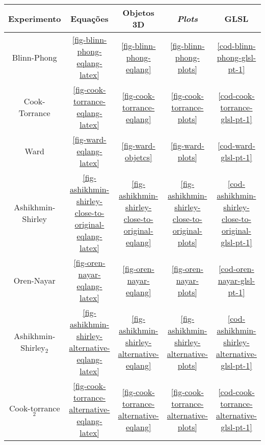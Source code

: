 \begin{table}[H]
\centering
\begin{tabular}{|c|c|c|c|c|}
\hline
    \textbf{Experimento} & \textbf{Equações}                                                & \textbf{Objetos 3D}                                       & \textbf{\textit{Plots}}                                  & \textbf{GLSL}  \\ \hline
    Blinn-Phong          & \autoref{fig-blinn-phong-eqlang-latex}                           & \autoref{fig-blinn-phong-eqlang}                          & \autoref{fig-blinn-phong-plots}                          &                  \autoref{cod-blinn-phong-glsl-pt-1}              \\ \hline
    Cook-Torrance        & \autoref{fig-cook-torrance-eqlang-latex}                         & \autoref{fig-cook-torrance-eqlang}                        & \autoref{fig-cook-torrance-plots}                        &             \autoref{cod-cook-torrance-glsl-pt-1}              \\ \hline
    Ward                 & \autoref{fig-ward-eqlang-latex}                                  & \autoref{fig-ward-objetcs}                                & \autoref{fig-ward-plots}                                 &                     \autoref{cod-ward-glsl-pt-1}               \\ \hline
    Ashikhmin-Shirley    & \autoref{fig-ashikhmin-shirley-close-to-original-eqlang-latex}   & \autoref{fig-ashikhmin-shirley-close-to-original-eqlang}  & \autoref{fig-ashikhmin-shirley-close-to-original-plots}  &                  \autoref{cod-ashikhmin-shirley-close-to-original-glsl-pt-1}              \\ \hline
    Oren-Nayar           & \autoref{fig-oren-nayar-eqlang-latex}                            & \autoref{fig-oren-nayar-eqlang}                           & \autoref{fig-oren-nayar-plots}                           &                \autoref{cod-oren-nayar-glsl-pt-1}              \\ \hline
    Ashikhmin-Shirley$_2$& \autoref{fig-ashikhmin-shirley-alternative-eqlang-latex}         & \autoref{fig-ashikhmin-shirley-alternative-eqlang}        & \autoref{fig-ashikhmin-shirley-alternative-plots}        &                  \autoref{cod-ashikhmin-shirley-alternative-glsl-pt-1}              \\ \hline
    Cook-torrance$_2$    & \autoref{fig-cook-torrance-alternative-eqlang-latex}             & \autoref{fig-cook-torrance-alternative-eqlang}            & \autoref{fig-cook-torrance-alternative-plots}            & \autoref{cod-cook-torrance-alternative-glsl-pt-1}              \\ \hline

\end{tabular}
\end{table}

